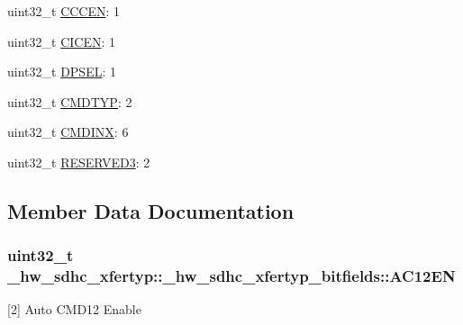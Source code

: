 \begin{DoxyCompactItemize}
uint32\+\_\+t \hyperlink{struct__hw__sdhc__xfertyp_1_1__hw__sdhc__xfertyp__bitfields_a9cb2f57ff5b991366d845dd6ffd6cd70}{C\+C\+C\+EN}\+: 1
\item 
uint32\+\_\+t \hyperlink{struct__hw__sdhc__xfertyp_1_1__hw__sdhc__xfertyp__bitfields_aeb1ef2414425082a4ec04e461e6aec90}{C\+I\+C\+EN}\+: 1
\item 
uint32\+\_\+t \hyperlink{struct__hw__sdhc__xfertyp_1_1__hw__sdhc__xfertyp__bitfields_a3421dba4026ed229353012058dd18ea3}{D\+P\+S\+EL}\+: 1
\item 
uint32\+\_\+t \hyperlink{struct__hw__sdhc__xfertyp_1_1__hw__sdhc__xfertyp__bitfields_a6227f65f46d19ab64ff0e4514a995f4d}{C\+M\+D\+T\+YP}\+: 2
\item 
uint32\+\_\+t \hyperlink{struct__hw__sdhc__xfertyp_1_1__hw__sdhc__xfertyp__bitfields_a9763f8d1450a266f4c93d488d8e81442}{C\+M\+D\+I\+NX}\+: 6
\item 
uint32\+\_\+t \hyperlink{struct__hw__sdhc__xfertyp_1_1__hw__sdhc__xfertyp__bitfields_a9c79d5bbc854bc79d78b4d18a1568bda}{R\+E\+S\+E\+R\+V\+E\+D3}\+: 2
\end{DoxyCompactItemize}


\subsection{Member Data Documentation}
\subsubsection[{\texorpdfstring{A\+C12\+EN}{AC12EN}}]{\setlength{\rightskip}{0pt plus 5cm}uint32\+\_\+t \+\_\+hw\+\_\+sdhc\+\_\+xfertyp\+::\+\_\+hw\+\_\+sdhc\+\_\+xfertyp\+\_\+bitfields\+::\+A\+C12\+EN}\hypertarget{struct__hw__sdhc__xfertyp_1_1__hw__sdhc__xfertyp__bitfields_a87f55fb03806337eb2884fd77a27ef1a}{}\label{struct__hw__sdhc__xfertyp_1_1__hw__sdhc__xfertyp__bitfields_a87f55fb03806337eb2884fd77a27ef1a}
\mbox{[}2\mbox{]} Auto C\+M\+D12 Enable 
